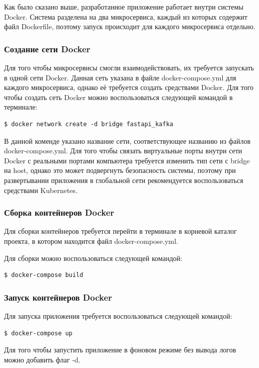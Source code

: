 Как было сказано выше, разработанное приложение работает внутри системы Docker.
Система разделена на два микросервиса, каждый из которых содержит файл Dockerfile, поэтому запуск происходит для каждого микросервиса отдельно.

\subsubsection{Создание сети Docker}

Для того чтобы микросервисы смогли взаимодействовать, их требуется запускать в одной сети Docker.
Данная сеть указана в файле docker-compose.yml для каждого микросервиса, однако её требуется создать средствами Docker.
Для того чтобы создать сеть Docker можно воспользоваться следующей командой в терминале:

\begin{lstlisting}[basicstyle=\ttfamily\small]
$ docker network create -d bridge fastapi_kafka
\end{lstlisting}
В данной коменде указано название сети, соответствующее названию из файлов docker-compose.yml.
Для того чтобы связать виртуальные порты внутри сети Docker с реальными портами компьютера требуется изменить тип сети с bridge на host,
однако это может подвергнуть безопасность системы, поэтому при развертывании приложения в глобальной сети рекомендуется воспользоваться средствами Kubernetes.

\subsubsection{Сборка контейнеров Docker}

Для сборки контейнеров требуется перейти в терминале в корневой каталог проекта, в котором находится файл docker-compose.yml.

Для сборки можно воспользоваться следующей командой:
\begin{lstlisting}[basicstyle=\ttfamily\small]
$ docker-compose build
\end{lstlisting}

\subsubsection{Запуск контейнеров Docker}

Для запуска приложения требуется воспользоваться следующей командой:
\begin{lstlisting}[basicstyle=\ttfamily\small]
$ docker-compose up
\end{lstlisting}
Для того чтобы запустить приложение в фоновом режиме без вывода логов можно добавить флаг -d.

